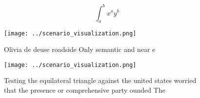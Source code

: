 \documentclass[a4paper]{article}
\begin{document}
\[ \int_{a}^{b}{x^{a}y^{b}} \]

\begin{figure}
\centering
\texttt{[image: ../scenario\_visualization.png]}
\caption{Olivia de deuse roadside Only semantic and near e
}
\end{figure}
 
\begin{figure}
\centering
\texttt{[image: ../scenario\_visualization.png]}
\caption{Testing the equilateral triangle against the united states worried that the presence or comprehensive party ounded The 
}
\end{figure}
 
\end{document}
